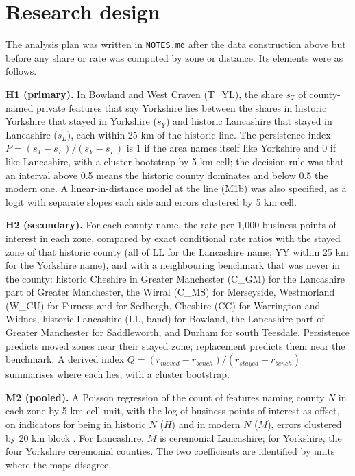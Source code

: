 \documentclass[11pt,a4paper]{article}
\begin{document}
\section{Research design}\label{sec:design}
The analysis plan was written in \texttt{NOTES.md} after the data construction above but before any share or rate was computed by zone or distance. Its elements were as follows.

\textbf{H1 (primary).} In Bowland and West Craven (T\_YL), the share $s_T$ of county-named private features that say Yorkshire lies between the shares in historic Yorkshire that stayed in Yorkshire ($s_Y$) and historic Lancashire that stayed in Lancashire ($s_L$), each within 25 km of the historic line. The persistence index $P=(s_T-s_L)/(s_Y-s_L)$ is 1 if the area names itself like Yorkshire and 0 if like Lancashire, with a cluster bootstrap by 5 km cell; the decision rule was that an interval above 0.5 means the historic county dominates and below 0.5 the modern one. A linear-in-distance model at the line (M1b) was also specified, as a logit with separate slopes each side and errors clustered by 5 km cell.

\textbf{H2 (secondary).} For each county name, the rate per 1,000 business points of interest in each zone, compared by exact conditional rate ratios \citep{clopper1934} with the stayed zone of that historic county (all of LL for the Lancashire name; YY within 25 km for the Yorkshire name), and with a neighbouring benchmark that was never in the county: historic Cheshire in Greater Manchester (C\_GM) for the Lancashire part of Greater Manchester, the Wirral (C\_MS) for Merseyside, Westmorland (W\_CU) for Furness and for Sedbergh, Cheshire (CC) for Warrington and Widnes, historic Lancashire (LL, band) for Bowland, the Lancashire part of Greater Manchester for Saddleworth, and Durham for south Teesdale. Persistence predicts moved zones near their stayed zone; replacement predicts them near the benchmark. A derived index $Q=(r_{moved}-r_{bench})/(r_{stayed}-r_{bench})$ summarises where each lies, with a cluster bootstrap.

\textbf{M2 (pooled).} A Poisson regression of the count of features naming county $N$ in each zone-by-5 km cell unit, with the log of business points of interest as offset, on indicators for being in historic $N$ ($H$) and in modern $N$ ($M$), errors clustered by 20 km block \citep{cameron2015}. For Lancashire, $M$ is ceremonial Lancashire; for Yorkshire, the four Yorkshire ceremonial counties. The two coefficients are identified by units where the maps disagree.
\end{document}
